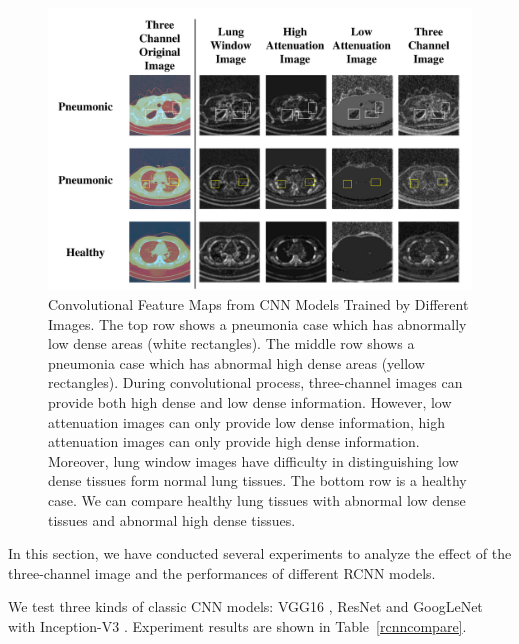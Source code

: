 \documentclass[journal]{IEEEtran}
\begin{document}
\begin{figure}[t]
    \centerline{\includegraphics[width=150mm]{show.pdf}}
    \vspace{-0cm}
    \caption{Convolutional Feature Maps from CNN Models Trained by Different Images. 
    The top row shows a pneumonia case which has abnormally low dense areas (white rectangles). The middle row shows a pneumonia case which has abnormal high dense areas (yellow rectangles). During convolutional process, three-channel images can provide both high dense and low dense information. However, low attenuation images can only provide low dense information, high attenuation images can only provide high dense information. Moreover, lung window images have difficulty in distinguishing low dense tissues form normal lung tissues.
    The bottom row is a healthy case. We can compare healthy lung tissues with abnormal low dense tissues and abnormal high dense tissues.
    }
    \vspace{-0cm}
    \label{show}
    \end{figure}

In this section, we have conducted several experiments to analyze the effect of the three-channel image and the performances of different RCNN models. 

We test three kinds of classic CNN models: VGG16 \cite{simonyan2015very}, ResNet \cite{he2016deep} and GoogLeNet with Inception-V3 \cite{szegedy2016rethinking}. Experiment results are shown in Table~\ref{rcnncompare}. 
\end{document}
